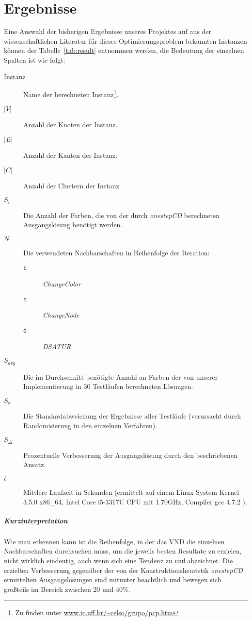 \appendix

\chapter{Ergebnisse}

Eine Auswahl der bisherigen Ergebnisse unseres Projektes auf aus der wissenschaftlichen Li\-te\-ra\-tur für dieses Optimierungsproblem bekannten Instanzen können der Tabelle~\ref{tab:result} entnommen werden, die Bedeutung der einzelnen Spalten ist wie folgt:

\begin{description}
    \item[Instanz] Name der berechneten Instanz\footnote{Zu finden unter \url{www.ic.uff.br/~celso/grupo/pcp.htm}}.%
    \item[$|V|$] Anzahl der Knoten der Instanz.
    \item[$|E|$] Anzahl der Kanten der Instanz.
    \item[$|C|$] Anzahl der Clustern der Instanz.
    \item[$S_i$] Die Anzahl der Farben, die von der durch \emph{onestepCD} berechneten Ausgangslösung benötigt werden.
    \item[$N$] Die verwendeten Nachbarschaften in Reihenfolge der Iteration:
        \begin{description}
            \item[\texttt{c}] \emph{ChangeColor}
            \item[\texttt{n}] \emph{ChangeNode}
            \item[\texttt{d}] \emph{DSATUR}
        \end{description}
    \item[$S_{avg}$] Die im Durchschnitt benötigte Anzahl an Farben der von unserer Implementierung in 30 Testläufen berechneten Lösungen.
    \item[$S_{\sigma}$] Die Standardabweichung der Ergebnisse aller Testläufe (verursacht durch Ran\-dom\-isier\-ung in den einzelnen Verfahren).
    \item[$S_{\Delta}$] Prozentuelle Verbesserung der Ausgangslösung durch den beschriebenen Ansatz.
    \item[$t$] Mittlere Laufzeit in Sekunden (ermittelt auf einem Linux-System Kernel 3.5.0 x86\_64, Intel Core i5-3317U CPU mit 1.70GHz, Compiler gcc 4.7.2 ).
\end{description}

\paragraph{Kurzinterpretation}{Wie man erkennen kann ist die Reihenfolge, in der das VND die einzelnen Nachbarschaften durchsuchen muss, um die jeweils besten Resultate zu erzielen, nicht wirklich eindeutig, auch wenn sich eine Tendenz zu \texttt{cnd} abzeichnet. Die erzielten Verbesserung gegenüber der von der Konstruktionsheuristik \emph{onestepCD} ermittelten Ausgangslösungen sind mitunter beachtlich und bewegen sich großteils im Bereich zwischen 20 und 40\%.}

